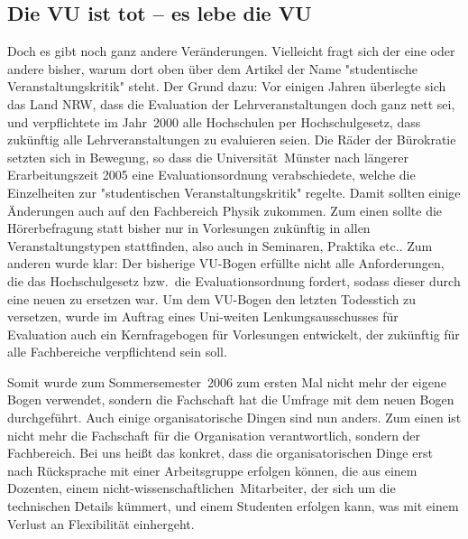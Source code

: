 \begin{multicols}{2}
\subsection{Die VU ist tot -- es lebe die VU}
Doch es gibt noch ganz andere Veränderungen.
Vielleicht fragt sich der eine oder andere bisher, warum dort oben über dem Artikel der Name "studentische Veranstaltungskritik" steht.
Der Grund dazu: Vor einigen Jahren überlegte sich das Land NRW, dass die Evaluation der Lehrveranstaltungen doch ganz nett sei, und verpflichtete im Jahr~2000 alle Hochschulen per Hochschulgesetz, dass zukünftig alle Lehrveranstaltungen zu evaluieren seien.
Die Räder der Bürokratie setzten sich in Bewegung, so dass die Universität~Münster nach längerer Erarbeitungszeit 2005 eine Evaluationsordnung verabschiedete, welche die Einzelheiten zur "studentischen Veranstaltungskritik" regelte.
Damit sollten einige Änderungen auch auf den Fachbereich Physik zukommen.
Zum einen sollte die Hörerbefragung statt bisher nur in Vorlesungen zukünftig in allen Veranstaltungstypen stattfinden, also auch in Seminaren, Praktika etc..
Zum anderen wurde klar: Der bisherige VU-Bogen erfüllte nicht alle Anforderungen, die das Hochschulgesetz bzw.\ die Evaluationsordnung fordert, sodass dieser durch eine neuen zu ersetzen war.
Um dem VU-Bogen den letzten Todesstich zu versetzen, wurde im Auftrag eines Uni-weiten Lenkungsausschusses für Evaluation auch ein Kernfragebogen für Vorlesungen entwickelt, der zukünftig für alle Fachbereiche verpflichtend sein soll.

\vspace{-2ex}
\begin{center}
\end{center}

Somit wurde zum Sommersemester~2006 zum ersten Mal nicht mehr der eigene Bogen verwendet, sondern die Fachschaft hat die Umfrage mit dem neuen Bogen durchgeführt.
Auch einige organisatorische Dingen sind nun anders.
Zum einen ist nicht mehr die Fachschaft für die Organisation verantwortlich, sondern der Fachbereich.
Bei uns heißt das konkret, dass die organisatorischen Dinge erst nach Rücksprache mit einer Arbeitsgruppe erfolgen können, die aus einem Dozenten, einem nicht-wissenschaftlichen~Mitarbeiter, der sich um die technischen Details kümmert, und einem Studenten erfolgen kann, was mit einem Verlust an Flexibilität einhergeht.


\end{multicols}
